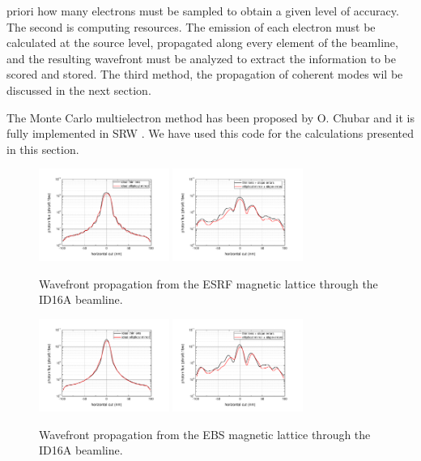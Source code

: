 \documentclass{iucr}              %
\begin{document}
priori how many electrons must be sampled to obtain a given level of accuracy. The second is computing resources. The emission of each electron must be calculated at the source level, propagated along every element of the beamline, and the resulting wavefront must be analyzed to extract the information to be scored and stored. The third method, the propagation of coherent modes wil be discussed in the next section. 

The Monte Carlo multielectron method has been proposed by O. Chubar and it is fully implemented in SRW \cite{codeSRW}. We have used this code for the calculations presented in this section.  

\begin{figure}
    \centering
        \includegraphics[width=4.25cm]{GRAPHICS/esrf_idealTE_idealOE_h.pdf}
        \includegraphics[width=4.25cm]{GRAPHICS/esrf_slopeTE_slopeOE_h.pdf}
    \label{fig:FiniteEmittanceA}
    \caption{Wavefront propagation from the ESRF magnetic lattice through the ID16A beamline.}
\end{figure}

\begin{figure}
    \centering
        \includegraphics[width=4.25cm]{GRAPHICS/ebs_idealTE_idealOE_h.pdf}
        \includegraphics[width=4.25cm]{GRAPHICS/ebs_slopeTE_slopeOE_h.pdf}
    \label{fig:FiniteEmittanceB}
    \caption{Wavefront propagation from the EBS magnetic lattice through the ID16A beamline.}
\end{figure}
\end{document}
